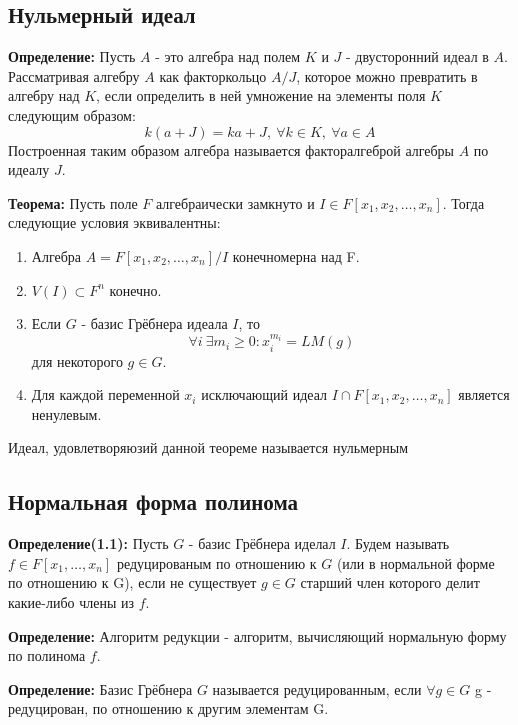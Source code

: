 \documentclass{article}
\begin{document}
    \newpage
    \subsection{Нульмерный идеал}
    \textbf{Определение:} Пусть $A$  - это алгебра над полем $K$ и $J$ - двусторонний идеал в $A$. Рассматривая
    алгебру $A$ как факторкольцо $A/J$, которое можно превратить в алгебру над $K$, если определить в ней умножение
    на элементы поля $K$ следующим образом:
    $$k(a+J) = ka+J, \: \forall k \in K,\: \forall a \in A$$
    Построенная таким образом алгебра называется факторалгеброй алгебры $A$ по идеалу $J$.

    \textbf{Теорема:} Пусть поле $F$ алгебраически замкнуто и $I\in F[x_1, x_2,\ldots, x_n]$.
       Тогда следующие условия эквивалентны:
        
        \begin{enumerate}
            \item Алгебра $A=F[x_1, x_2,\ldots, x_n]/I$ конечномерна над F.
            \item $V(I) \subset F^n$ конечно.
            \item Если $G$ - базис Грёбнера идеала $I$, то $$\forall i \: \exists m_i \geq 0 : x_i^{m_i} = LM(g)$$ для некоторого $g \in G$.
            \item Для каждой переменной $x_i$ исключающий идеал $I \cap F[x_1, x_2,\ldots, x_n]$ является ненулевым.
        \end{enumerate}

      Идеал, удовлетворяюзий данной теореме называется нульмерным

    \newpage

    \subsection{Нормальная форма полинома}

    
    \textbf{Определение(1.1):} Пусть $G$ - базис Грёбнера иделал $I$.
    Будем называть $f \in F[x_1,\ldots,x_n]$ редуцированым по отношению к $G$ (или в нормальной форме по отношению к G), если 
    не существует $g \in G$ старший член которого делит какие-либо члены из $f$.
    
    \textbf{Определение:} Алгоритм редукции - алгоритм, вычисляющий нормальную форму по полинома $f$.
    
    \textbf{Определение:} Базис Грёбнера $G$ называется редуцированным, если $\forall g \in G$ g - редуцирован, по отношению к другим элементам G.
               
\end{document}
